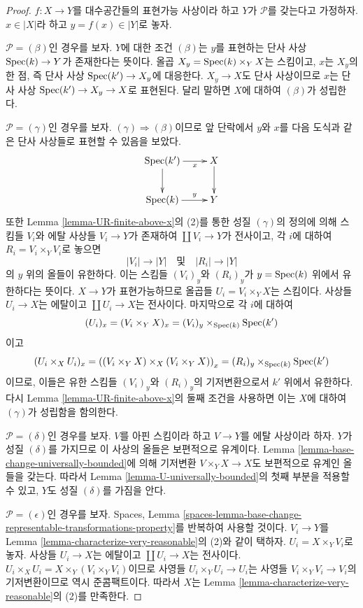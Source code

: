 \begin{proof}
$f : X \to Y$를 대수공간들의 표현가능 사상이라 하고
$Y$가 $\mathcal{P}$를 갖는다고 가정하자. $x \in |X|$라 하고
$y = f(x) \in |Y|$로 놓자.

\medskip\noindent
$\mathcal{P} = (\beta)$인 경우를 보자. $Y$에 대한 조건 $(\beta)$는
$y$를 표현하는 단사 사상 $\mathop{\mathrm{Spec}}(k) \to Y$가 존재한다는 뜻이다.
올곱 $X_y = \mathop{\mathrm{Spec}}(k) \times_Y X$는 스킴이고, $x$는 $X_y$의 한 점,
즉 단사 사상 $\mathop{\mathrm{Spec}}(k') \to X_y$에 대응한다.
$X_y \to X$도 단사 사상이므로 $x$는 단사 사상
$\mathop{\mathrm{Spec}}(k') \to X_y \to X$로 표현된다. 달리 말하면 $X$에 대하여
$(\beta)$가 성립한다.

\medskip\noindent
$\mathcal{P} = (\gamma)$인 경우를 보자.
$(\gamma) \Rightarrow (\beta)$이므로 앞 단락에서 $y$와 $x$를 다음
도식과 같은 단사 사상들로 표현할 수 있음을 보았다.
$$
\xymatrix{
\Spec(k') \ar[r]_-x \ar[d] & X \ar[d] \\
\Spec(k) \ar[r]^-y & Y
}
$$
또한 Lemma \ref{lemma-UR-finite-above-x}의 (2)를 통한 성질
$(\gamma)$의 정의에 의해 스킴들 $V_i$와 에탈 사상들 $V_i \to Y$가
존재하여 $\coprod V_i \to Y$가 전사이고, 각 $i$에 대하여
$R_i = V_i \times_Y V_i$로 놓으면
$$
|V_i| \longrightarrow |Y|
\quad\text{및}\quad
|R_i| \longrightarrow |Y|
$$
의 $y$ 위의 올들이 유한하다. 이는 스킴들 $(V_i)_y$와 $(R_i)_y$가
$y = \mathop{\mathrm{Spec}}(k)$ 위에서 유한하다는 뜻이다.
$X \to Y$가 표현가능하므로 올곱들 $U_i = V_i \times_Y X$는 스킴이다.
사상들 $U_i \to X$는 에탈이고 $\coprod U_i \to X$는 전사이다.
마지막으로 각 $i$에 대하여
$$
(U_i)_x =
(V_i \times_Y X)_x =
(V_i)_y \times_{\mathop{\mathrm{Spec}}(k)} \mathop{\mathrm{Spec}}(k')
$$
이고
$$
(U_i \times_X U_i)_x =
\left((V_i \times_Y X) \times_X (V_i \times_Y X)\right)_x =
(R_i)_y \times_{\mathop{\mathrm{Spec}}(k)} \mathop{\mathrm{Spec}}(k')
$$
이므로, 이들은 유한 스킴들 $(V_i)_y$와 $(R_i)_y$의 기저변환으로서
$k'$ 위에서 유한하다. 다시 Lemma
\ref{lemma-UR-finite-above-x}의 둘째 조건을 사용하면 이는 $X$에
대하여 $(\gamma)$가 성립함을 함의한다.

\medskip\noindent
$\mathcal{P} = (\delta)$인 경우를 보자. $V$를 아핀 스킴이라 하고
$V \to Y$를 에탈 사상이라 하자. $Y$가 성질 $(\delta)$를 가지므로
이 사상의 올들은 보편적으로 유계이다. Lemma
\ref{lemma-base-change-universally-bounded}에 의해 기저변환
$V \times_Y X \to X$도 보편적으로 유계인 올들을 갖는다.
따라서 Lemma \ref{lemma-U-universally-bounded}의 첫째 부분을 적용할
수 있고,
$Y$도 성질 $(\delta)$를 가짐을 안다.

\medskip\noindent
$\mathcal{P} = (\epsilon)$인 경우를 보자. Spaces, Lemma
\ref{spaces-lemma-base-change-representable-transformations-property}를
반복하여 사용할 것이다. $V_i \to Y$를 Lemma
\ref{lemma-characterize-very-reasonable}의 (2)와 같이 택하자.
$U_i = X \times_Y V_i$로 놓자. 사상들 $U_i \to X$는 에탈이고
$\coprod U_i \to X$는 전사이다.
$U_i \times_X U_i = X \times_Y (V_i \times_Y V_i)$이므로
사영들 $U_i \times_Y U_i \to U_i$는 사영들
$V_i \times_Y V_i \to V_i$의 기저변환이므로 역시 준콤팩트이다.
따라서 $X$는 Lemma \ref{lemma-characterize-very-reasonable}의 (2)를
만족한다.


\end{proof}
